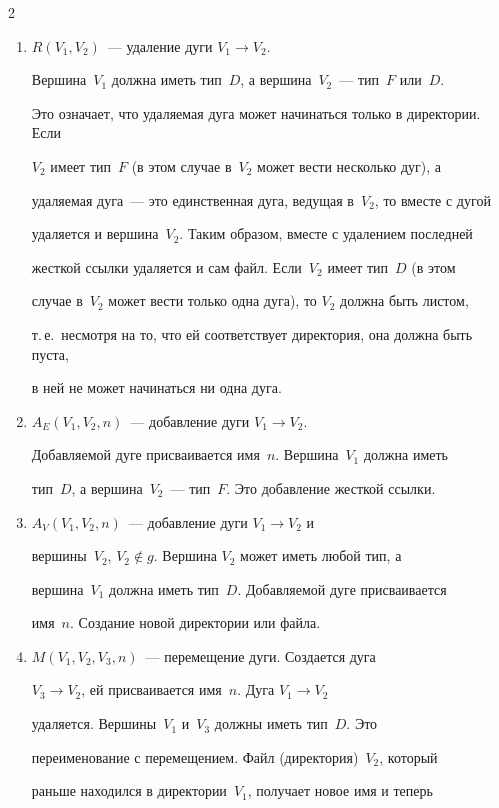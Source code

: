 \begin{multicols}{2}
     \begin{enumerate}


     \item $R(V_1, V_2)$~--- удаление дуги $V_1\rightarrow V_2$. 


Вершина~$V_1$ должна иметь тип~$D$, а вершина~$V_2$~--- тип~$F$ или~$D$. 


Это означает, что удаляемая дуга может начинаться только в директории. Если 


$V_2$ имеет тип~$F$ (в этом случае в~$V_2$ может вести несколько дуг), а 


удаляемая дуга~--- это единственная дуга, ведущая в~$V_2$, то вместе с дугой 


удаляется и вершина~$V_2$. Таким образом, вместе с удалением последней 


жесткой ссылки удаляется и сам файл. Если~$V_2$ имеет тип~$D$ (в этом 


случае в~$V_2$ может вести только одна дуга), то $V_2$ должна быть листом, 


т.\,е.\ несмотря на то, что ей соответствует директория, она должна быть пуста, 


в ней не может начинаться ни одна дуга. 


\item $A_E(V_1, V_2, n)$~--- добавление дуги $V_1\rightarrow V_2$. 


До\-бав\-ля\-емой дуге присваивается имя~$n$. Вершина~$V_1$ должна иметь 


тип~$D$, а вершина~$V_2$~--- тип~$F$. Это добавление жесткой ссылки.


\item $A_V(V_1, V_2, n)$~--- добавление дуги $V_1\rightarrow V_2$ и 


вершины~$V_2$, $V_2\notin g$. Вершина $V_2$ может иметь любой тип, а 


вершина~$V_1$ должна иметь тип~$D$. До\-бав\-ля\-емой дуге присваивается 


имя~$n$. Создание новой директории или файла.


\item $M(V_1, V_2, V_3, n)$~--- перемещение дуги. Создается дуга 


$V_3\rightarrow V_2$, ей присваивается имя~$n$. Дуга $V_1\rightarrow V_2$ 


удаляется. Вершины~$V_1$ и~$V_3$ должны иметь тип~$D$. Это 


переименование с перемещением. Файл (директория)~$V_2$, который 


раньше находился в директории~$V_1$, получает новое имя и теперь 



\end{enumerate}
\end{multicols}
